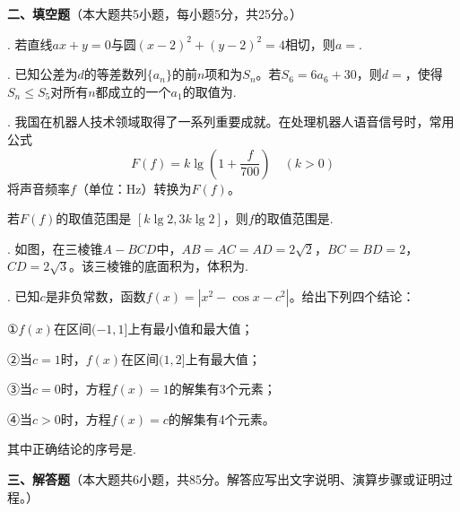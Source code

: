 \noindent\textbf{二、填空题}（本大题共5小题，每小题5分，共25分。）

. 若直线$ax+y=0$与圆$(x-2)^2+(y-2)^2=4$相切，则$a=$\underline{\hspace{3cm}}.

. 已知公差为$d$的等差数列$\{a_n\}$的前$n$项和为$S_n$。若$S_6=6a_6+30$，则$d=$\underline{\hspace{2.5cm}}，使得$S_n\leqslant S_5$对所有$n$都成立的一个$a_1$的取值为\underline{\hspace{2.5cm}}.

. 我国在机器人技术领域取得了一系列重要成就。在处理机器人语音信号时，常用公式
\[
F(f)=k\lg\left(1+\frac{f}{700}\right)\quad(k>0)
\]
将声音频率$f$（单位：Hz）转换为$F(f)$。
\par\noindent 若$F(f)$的取值范围是
$[k\lg2,3k\lg2]$，则$f$的取值范围是\underline{\hspace{3cm}}.

. 如图，在三棱锥$A-BCD$中，$AB=AC=AD=2\sqrt2$，$BC=BD=2$，$CD=2\sqrt3$。该三棱锥的底面积为\underline{\hspace{2.5cm}}，体积为\underline{\hspace{2.5cm}}.

\begin{center}
\end{center}

. 已知$c$是非负常数，函数$f(x)=|x^2-\cos x-c^2|$。给出下列四个结论：

\noindent ①$f(x)$在区间$(-1,1]$上有最小值和最大值；

\noindent ②当$c=1$时，$f(x)$在区间$(1,2]$上有最大值；

\noindent ③当$c=0$时，方程$f(x)=1$的解集有3个元素；

\noindent ④当$c>0$时，方程$f(x)=c$的解集有4个元素。

\noindent 其中正确结论的序号是\underline{\hspace{3cm}}.

\newpage
\noindent\textbf{三、解答题}（本大题共6小题，共85分。解答应写出文字说明、演算步骤或证明过程。）


